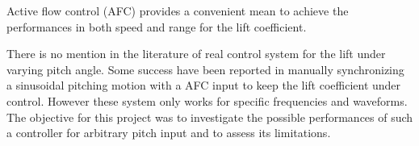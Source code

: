 Active flow control (AFC) provides a convenient mean to achieve the performances in both speed and range for the lift coefficient. 

\par There is no mention in the literature of real control system for the lift under varying pitch angle.
Some success have been reported in manually synchronizing a sinusoidal pitching motion with a AFC input to keep the lift coefficient under control. 
However these system only works for specific frequencies and waveforms. 
The objective for this project was to investigate the possible performances of such a controller for arbitrary pitch input and to assess its limitations.



